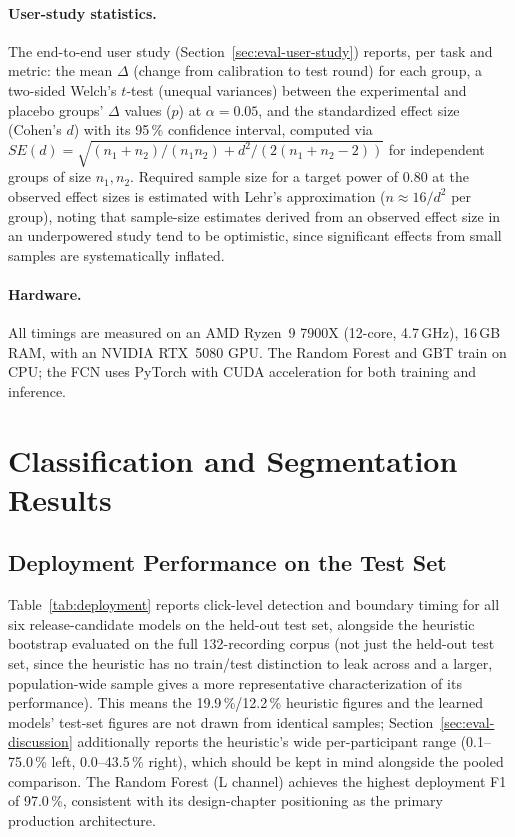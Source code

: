 \paragraph{User-study statistics.}
The end-to-end user study (Section~\ref{sec:eval-user-study}) reports, per
task and metric: the mean $\Delta$ (change from calibration to test round) for
each group, a two-sided Welch's $t$-test (unequal variances) between the
experimental and placebo groups' $\Delta$ values ($p$) at $\alpha=0.05$, and
the standardized effect size (Cohen's $d$)
with its 95\,\% confidence interval, computed via
$SE(d) = \sqrt{(n_1+n_2)/(n_1 n_2) + d^2/(2(n_1+n_2-2))}$ for independent
groups of size $n_1, n_2$. Required sample size for a target power of 0.80 at
the observed effect sizes is estimated with Lehr's approximation
($n \approx 16/d^2$ per group), noting that sample-size estimates derived from
an observed effect size in an underpowered study tend to be optimistic, since
significant effects from small samples are systematically inflated.

\paragraph{Hardware.}
All timings are measured on an AMD Ryzen~9 7900X (12-core, 4.7\,GHz), 16\,GB RAM,
with an NVIDIA RTX~5080 GPU.  The Random Forest and GBT train on CPU; the FCN uses
PyTorch with CUDA acceleration for both training and inference.

\section{Classification and Segmentation Results}
\label{sec:eval-results}

\subsection{Deployment Performance on the Test Set}
Table~\ref{tab:deployment} reports click-level detection and boundary timing for all
six release-candidate models on the held-out test set, alongside the heuristic
bootstrap evaluated on the full 132-recording corpus (not just the held-out test
set, since the heuristic has no train/test distinction to leak across and a
larger, population-wide sample gives a more representative characterization of
its performance). This means the 19.9\,\%/12.2\,\% heuristic figures and the
learned models' test-set figures are not drawn from identical samples;
Section~\ref{sec:eval-discussion} additionally reports the heuristic's wide
per-participant range (0.1--75.0\,\% left, 0.0--43.5\,\% right), which should
be kept in mind alongside the pooled comparison. The Random Forest (L channel)
achieves the highest deployment F1 of 97.0\,\%, consistent with its design-chapter
positioning as the primary production architecture.

